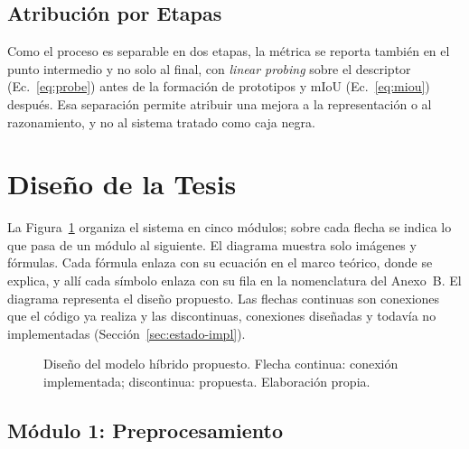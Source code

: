 \subsection{Atribución por Etapas}
\label{sec:metricas-hibrido}

Como el proceso es separable en dos etapas, la métrica se reporta también en el
punto intermedio y no solo al final, con \emph{linear probing} sobre el descriptor
(Ec.~\eqref{eq:probe}) antes de la formación de prototipos y mIoU
(Ec.~\eqref{eq:miou}) después. Esa separación permite atribuir una mejora a la
representación o al razonamiento, y no al sistema tratado como caja negra.

\section{Diseño de la Tesis}
\label{sec:diseno-teorico}

La Figura~\ref{fig:diseno} organiza el sistema en cinco módulos; sobre cada
flecha se indica lo que pasa de un módulo al siguiente. El diagrama muestra solo
imágenes y fórmulas. Cada fórmula enlaza con su ecuación en el marco teórico,
donde se explica, y allí cada símbolo enlaza con su fila en la nomenclatura del
Anexo~B. El diagrama representa el
diseño propuesto. Las flechas continuas son conexiones que el código ya realiza
y las discontinuas, conexiones diseñadas y todavía no implementadas
(Sección~\ref{sec:estado-impl}).

\begin{figure}[!t]
\centering
{\hypersetup{linkcolor=blue!55!black}\fuentediagrama
{}}
\caption[Diseño del modelo híbrido propuesto]{Diseño del modelo híbrido propuesto. Flecha continua: conexión
implementada; discontinua: propuesta. Elaboración propia.}
\label{fig:diseno}
\end{figure}

\subsection{Módulo 1: Preprocesamiento}
\label{sec:modulo1}

